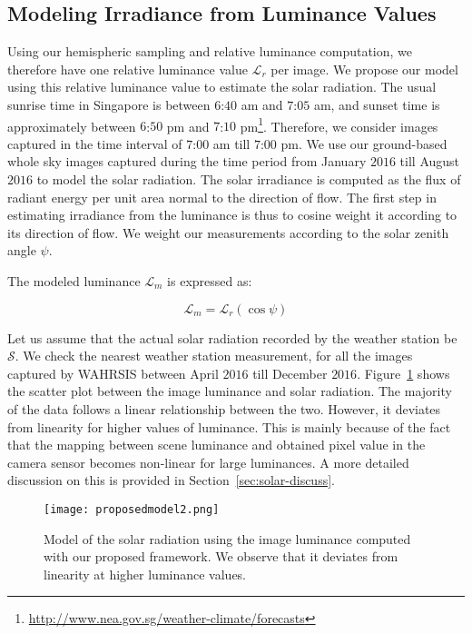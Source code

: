 \subsection{Modeling Irradiance from Luminance Values}
Using our hemispheric sampling and relative luminance computation, we therefore have one relative luminance value $\mathcal{L}_r$ per image. We propose our model using this relative luminance value to estimate the solar radiation. The usual sunrise time in Singapore is between $6$:$40$ am and $7$:$05$ am, and sunset time is approximately between $6$:$50$ pm and $7$:$10$ pm\footnote{\url{http://www.nea.gov.sg/weather-climate/forecasts}}. Therefore, we consider images captured in the time interval of $7$:$00$ am till $7$:$00$ pm. We use our ground-based whole sky images captured during the time period from January $2016$ till August $2016$ to model the solar radiation. The solar irradiance is computed as the flux of radiant energy per unit area normal to the direction of flow. The first step in estimating irradiance from the luminance is thus to cosine weight it according to its direction of flow. We weight our measurements according to the solar zenith angle $\psi$. 

The modeled luminance $\mathcal{L}_m$ is expressed as: 

\begin{equation*}
\mathcal{L}_m = \mathcal{L}_r(\cos\psi)
\end{equation*}

Let us assume that the actual solar radiation recorded by the weather station be $\mathcal{S}$. We check the nearest weather station measurement, for all the images captured by WAHRSIS between April $2016$ till December $2016$. Figure~\ref{fig:solar_model} shows the scatter plot between the image luminance and solar radiation. The majority of the data follows a linear relationship between the two. However, it deviates from linearity for higher values of luminance. This is mainly because of the fact that the mapping between scene luminance and obtained pixel value in the camera sensor becomes non-linear for large luminances. A more detailed discussion on this is provided in Section~\ref{sec:solar-discuss}.

\begin{figure}[htb]
\begin{center}
\texttt{[image: proposedmodel2.png]}
\caption[Proposed linear regressor model to estimate solar irradiance from sky images.]{Model of the solar radiation using the image luminance computed with our proposed framework. We observe that it deviates from linearity at higher luminance values. \label{fig:solar_model}}
\end{center}
\end{figure}


